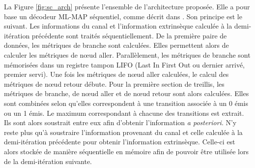 La Figure \ref{fig:sc_arch} présente l'ensemble de l'architecture proposée. Elle a pour base un décodeur ML-MAP séquentiel, 
comme décrit dans \cite{livre_declercq}. Son principe est le suivant. Les 
informations du canal et l'information extrinsèque calculée à la demi-itération précédente sont traités séquentiellement. De 
la première paire de données, les métriques de branche sont calculées. Elles permettent alors de calculer les métriques 
de nœud aller. Parallèlement, les métriques de branche sont mémorisées dans un registre tampon LIFO (Last In First Out ou 
dernier arrivé, premier servi). Une fois les métriques de nœud aller calculées, le calcul des métriques de nœud retour débute. 
Pour la première section de treillis, les métriques de branche, de nœud aller et de nœud retour sont alors calculées. 
Elles sont combinées selon qu'elles correspondent à une transition associée à un 0 émis ou un 1 émis. Le maximum 
correspondant à chacune des transitions est extrait. Ils sont alors soustrait entre eux afin d'obtenir l'information \textit{a posteriori}. N'y reste plus qu'à soustraire l'information provenant du canal et celle calculée à la demi-itération 
précédente pour obtenir l'information extrinsèque. Celle-ci est alors stockée de manière séquentielle en mémoire afin 
de pouvoir être utilisée lors de la demi-itération suivante.

